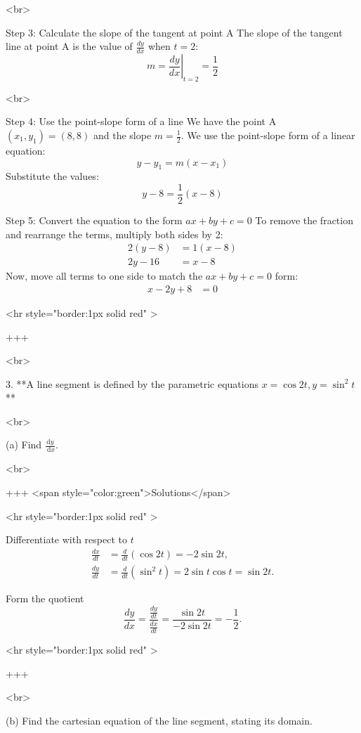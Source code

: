 <br>

Step 3: Calculate the slope of the tangent at point A
The slope of the tangent line at point A is the value of $\frac{dy}{dx}$ when $t=2$:
$$ m = \left.\frac{dy}{dx}\right|_{t=2} = \frac{1}{2} $$

<br>

Step 4: Use the point-slope form of a line
We have the point A $(x_1, y_1) = (8, 8)$ and the slope $m = \frac{1}{2}$. We use the point-slope form of a linear equation:
$$ y - y_1 = m(x - x_1) $$
Substitute the values:
$$ y - 8 = \frac{1}{2}(x - 8) $$

Step 5: Convert the equation to the form $ax + by + c = 0$
To remove the fraction and rearrange the terms, multiply both sides by 2:
\begin{align*} 2(y - 8) &= 1(x - 8) \\ 2y - 16 &= x - 8 \end{align*}
Now, move all terms to one side to match the $ax + by + c = 0$ form:
\begin{align*} x - 2y + 8 &= 0 \end{align*}

<hr style="border:1px solid red" >

+++

<br>


3. **A line segment is defined by the parametric equations $x=\cos 2 t, y=\sin ^{2} t$**

<br>

(a) Find $\frac{\mathrm{d} y}{\mathrm{~d} x}$.

<br>

+++ <span style="color:green">Solutions</span>

<hr style="border:1px solid red" >

Differentiate with respect to $t$
\begin{align*}
\frac{dx}{dt} &= \frac{d}{dt}(\cos 2t) = -2\sin 2t, \\
\frac{dy}{dt} &= \frac{d}{dt}(\sin^2 t) = 2\sin t\cos t = \sin 2t.
\end{align*}

Form the quotient
$$
\frac{dy}{dx} = \frac{\displaystyle\frac{dy}{dt}}{\displaystyle\frac{dx}{dt}}
= \frac{\sin 2t}{-2\sin 2t} = -\frac{1}{2}.
$$

<hr style="border:1px solid red" >

+++

<br>


(b) Find the cartesian equation of the line segment, stating its domain.

